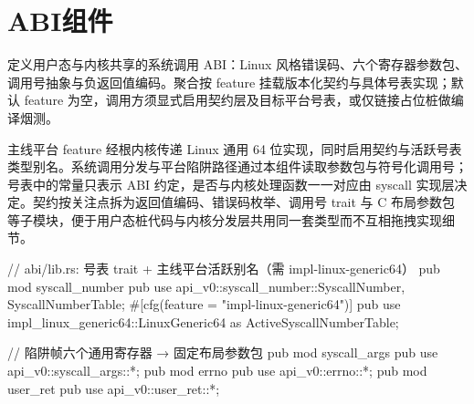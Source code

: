 
\section{ABI组件}

定义用户态与内核共享的系统调用 ABI：Linux 风格错误码、六个寄存器参数包、调用号抽象与负返回值编码。聚合按 feature 挂载版本化契约与具体号表实现；默认 feature 为空，调用方须显式启用契约层及目标平台号表，或仅链接占位桩做编译烟测。

主线平台 feature 经根内核传递 Linux 通用 64 位实现，同时启用契约与活跃号表类型别名。系统调用分发与平台陷阱路径通过本组件读取参数包与符号化调用号；号表中的常量只表示 ABI 约定，是否与内核处理函数一一对应由 syscall 实现层决定。契约按关注点拆为返回值编码、错误码枚举、调用号 trait 与 C 布局参数包等子模块，便于用户态桩代码与内核分发层共用同一套类型而不互相拖拽实现细节。

\begin{rustcode}
// abi/lib.rs: 号表 trait + 主线平台活跃别名（需 impl-linux-generic64）
pub mod syscall_number {
    pub use api_v0::syscall_number::{SyscallNumber, SyscallNumberTable};
    #[cfg(feature = "impl-linux-generic64")]
    pub use impl_linux_generic64::LinuxGeneric64 as ActiveSyscallNumberTable;
}
\end{rustcode}

\begin{rustcode}
// 陷阱帧六个通用寄存器 → 固定布局参数包
pub mod syscall_args { pub use api_v0::syscall_args::*; }
pub mod errno { pub use api_v0::errno::*; }
pub mod user_ret { pub use api_v0::user_ret::*; }
\end{rustcode}
